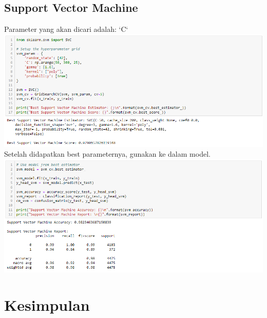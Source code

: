 \documentclass[12pt]{article}
\begin{document}
    \subsection{Support Vector Machine}
    \newline
    \newline Parameter yang akan dicari adalah: `C`
    \newline \includegraphics[scale=0.535]{svm-tune.png}
    \newline
    \newline Setelah didapatkan best parameternya, gunakan ke dalam model.
    \newline \includegraphics[scale=0.535]{svm-model.png}


\hspace{1 cm}
\newpage


\section{Kesimpulan}
\end{document}
